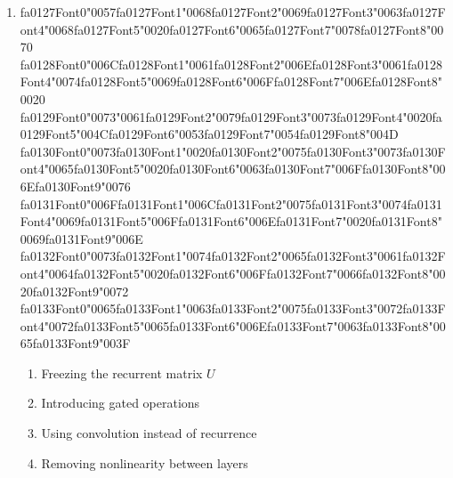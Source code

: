 \documentclass[12pt]{article}
\begin{document}
\begin{enumerate}[label=Q\arabic*.]
 \item {\csname fa0127Font0\endcsname\char"0057}{\csname fa0127Font1\endcsname\char"0068}{\csname fa0127Font2\endcsname\char"0069}{\csname fa0127Font3\endcsname\char"0063}{\csname fa0127Font4\endcsname\char"0068}{\csname fa0127Font5\endcsname\char"0020}{\csname fa0127Font6\endcsname\char"0065}{\csname fa0127Font7\endcsname\char"0078}{\csname fa0127Font8\endcsname\char"0070} {\csname fa0128Font0\endcsname\char"006C}{\csname fa0128Font1\endcsname\char"0061}{\csname fa0128Font2\endcsname\char"006E}{\csname fa0128Font3\endcsname\char"0061}{\csname fa0128Font4\endcsname\char"0074}{\csname fa0128Font5\endcsname\char"0069}{\csname fa0128Font6\endcsname\char"006F}{\csname fa0128Font7\endcsname\char"006E}{\csname fa0128Font8\endcsname\char"0020} {\csname fa0129Font0\endcsname\char"0073}{\char"0061}{\csname fa0129Font2\endcsname\char"0079}{\csname fa0129Font3\endcsname\char"0073}{\csname fa0129Font4\endcsname\char"0020}{\csname fa0129Font5\endcsname\char"004C}{\csname fa0129Font6\endcsname\char"0053}{\csname fa0129Font7\endcsname\char"0054}{\csname fa0129Font8\endcsname\char"004D} {\csname fa0130Font0\endcsname\char"0073}{\csname fa0130Font1\endcsname\char"0020}{\csname fa0130Font2\endcsname\char"0075}{\csname fa0130Font3\endcsname\char"0073}{\csname fa0130Font4\endcsname\char"0065}{\csname fa0130Font5\endcsname\char"0020}{\csname fa0130Font6\endcsname\char"0063}{\csname fa0130Font7\endcsname\char"006F}{\csname fa0130Font8\endcsname\char"006E}{\csname fa0130Font9\endcsname\char"0076} {\csname fa0131Font0\endcsname\char"006F}{\csname fa0131Font1\endcsname\char"006C}{\csname fa0131Font2\endcsname\char"0075}{\csname fa0131Font3\endcsname\char"0074}{\csname fa0131Font4\endcsname\char"0069}{\csname fa0131Font5\endcsname\char"006F}{\csname fa0131Font6\endcsname\char"006E}{\csname fa0131Font7\endcsname\char"0020}{\csname fa0131Font8\endcsname\char"0069}{\csname fa0131Font9\endcsname\char"006E} {\csname fa0132Font0\endcsname\char"0073}{\csname fa0132Font1\endcsname\char"0074}{\csname fa0132Font2\endcsname\char"0065}{\csname fa0132Font3\endcsname\char"0061}{\csname fa0132Font4\endcsname\char"0064}{\csname fa0132Font5\endcsname\char"0020}{\csname fa0132Font6\endcsname\char"006F}{\csname fa0132Font7\endcsname\char"0066}{\csname fa0132Font8\endcsname\char"0020}{\csname fa0132Font9\endcsname\char"0072} {\csname fa0133Font0\endcsname\char"0065}{\csname fa0133Font1\endcsname\char"0063}{\csname fa0133Font2\endcsname\char"0075}{\csname fa0133Font3\endcsname\char"0072}{\csname fa0133Font4\endcsname\char"0072}{\csname fa0133Font5\endcsname\char"0065}{\csname fa0133Font6\endcsname\char"006E}{\csname fa0133Font7\endcsname\char"0063}{\csname fa0133Font8\endcsname\char"0065}{\csname fa0133Font9\endcsname\char"003F}
 \begin{enumerate}[label=(\Alph*)]
     \item Freezing the recurrent matrix $U$
     \item Introducing gated operations
     \item Using convolution instead of recurrence
     \item Removing nonlinearity between layers
 \end{enumerate}
 

\end{enumerate}
\end{document}
